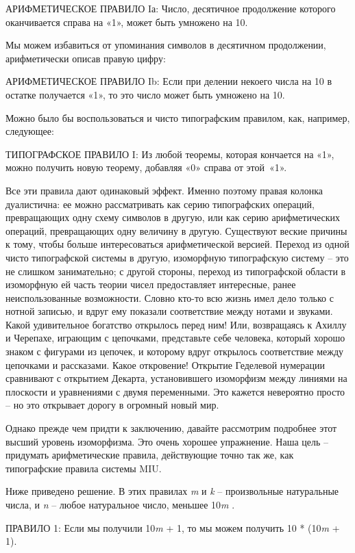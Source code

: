 \documentclass[../main.tex]{subfiles}
\begin{document}
АРИФМЕТИЧЕСКОЕ ПРАВИЛО Iа: Число, десятичное продолжение которого оканчивается справа на «1», может быть умножено на 10.

Мы можем избавиться от упоминания символов в десятичном продолжении, арифметически описав правую цифру:

АРИФМЕТИЧЕСКОЕ ПРАВИЛО Ib: Если при делении некоего числа на 10 в остатке получается «1», то это число может быть умножено на 10.

Можно было бы воспользоваться и чисто типографским правилом, как, например, следующее:

ТИПОГРАФСКОЕ ПРАВИЛО I: Из любой теоремы, которая кончается на «1», можно получить новую теорему, добавляя «0» справа от этой~«1».

Все эти правила дают одинаковый эффект. Именно поэтому правая колонка дуалистична: ее можно рассматривать как серию типографских операций, превращающих одну схему символов в другую, или как серию арифметических операций, превращающих одну величину в другую. Существуют веские причины к тому, чтобы больше интересоваться арифметической версией. Переход из одной чисто типографской системы в другую, изоморфную типографскую систему \--- это не слишком занимательно; с другой стороны, переход из типографской области в изоморфную ей часть теории чисел предоставляет интересные, ранее неиспользованные возможности. Словно кто-то всю жизнь имел дело только с нотной записью, и вдруг ему показали соответствие между нотами и звуками. Какой удивительное богатство открылось перед ним! Или, возвращаясь к Ахиллу и Черепахе, играющим с цепочками, представьте себе человека, который хорошо знаком с фигурами из цепочек, и которому вдруг открылось соответствие между цепочками и рассказами. Какое откровение! Открытие Геделевой нумерации сравнивают с открытием Декарта, установившего изоморфизм между линиями на плоскости и уравнениями с двумя переменными. Это кажется невероятно просто \--- но это открывает дорогу в огромный новый мир.

Однако прежде чем придти к заключению, давайте рассмотрим подробнее этот высший уровень изоморфизма. Это очень хорошее упражнение. Наша цель \--- придумать арифметические правила, действующие точно так же, как типографские правила системы MIU.

Ниже приведено решение. В этих правилах \emph{m} и \emph{k} \--- произвольные натуральные числа, и \emph{n} \--- любое натуральное число, меньшее 10\emph{m} .

ПРАВИЛО 1: Если мы получили 10\emph{m} + 1, то мы можем получить 10 * (10\emph{m} + 1).
\end{document}

